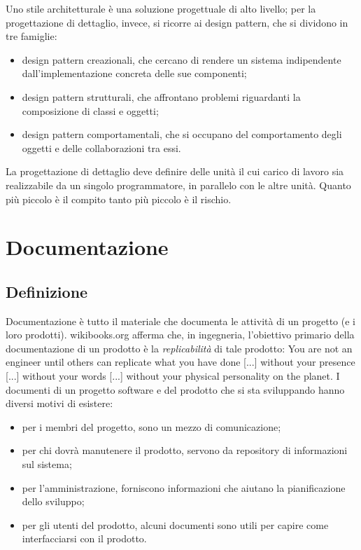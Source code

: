 \documentclass[a4paper]{article}
\begin{document}
		
Uno stile architetturale è una soluzione progettuale di alto livello; per la progettazione di dettaglio, invece, si ricorre ai design pattern, che si dividono in tre famiglie:
		
	\begin{itemize}
		
			
	\item design pattern creazionali, che cercano di rendere un sistema indipendente dall'implementazione concreta delle sue componenti;
			
	\item design pattern strutturali, che affrontano problemi riguardanti la composizione di classi e oggetti;
			
	\item design pattern comportamentali, che si occupano del comportamento degli oggetti e delle collaborazioni tra essi.
		
	\end{itemize}

		
La progettazione di dettaglio deve definire delle unità il cui carico di lavoro sia realizzabile da un singolo programmatore, in parallelo con le altre unità. Quanto più piccolo è il compito tanto più piccolo è il rischio.
	


		
	\section{Documentazione}


		
	\subsection{Definizione}

		
Documentazione è tutto il materiale che documenta le attività di un progetto (e i loro prodotti). wikibooks.org afferma che, in ingegneria, l'obiettivo primario della documentazione di un prodotto è la \emph{replicabilità} di tale prodotto: You are not an engineer until others can replicate what you have done [...] without your presence [...] without your words [...] without your physical personality on the planet. I documenti di un progetto software e del prodotto che si sta sviluppando hanno diversi motivi di esistere:
		
	\begin{itemize}
		
			
	\item per i membri del progetto, sono un mezzo di comunicazione;
			
	\item per chi dovrà manutenere il prodotto, servono da repository di informazioni sul sistema;
			
	\item per l'amministrazione, forniscono informazioni che aiutano la pianificazione dello sviluppo;
			
	\item per gli utenti del prodotto, alcuni documenti sono utili per capire come interfacciarsi con il prodotto.
		
	\end{itemize}
\end{document}
